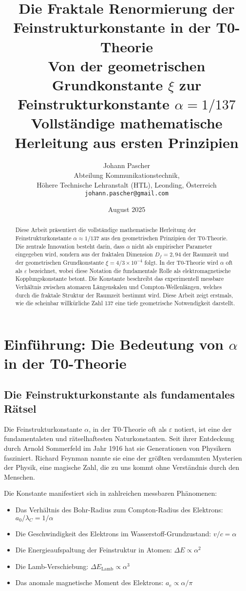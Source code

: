 \documentclass[12pt,a4paper]{article}
\title{\textbf{Die Fraktale Renormierung der Feinstrukturkonstante in der T0-Theorie}\\[0.5cm]
	\large Von der geometrischen Grundkonstante $\xi$ zur Feinstrukturkonstante $\alpha = 1/137$\\[0.3cm]
	\normalsize Vollständige mathematische Herleitung aus ersten Prinzipien}
\author{Johann Pascher\\
	\small Abteilung Kommunikationstechnik,\\
	\small Höhere Technische Lehranstalt (HTL), Leonding, Österreich\\
	\small \texttt{johann.pascher@gmail.com}}
\date{August 2025}
\theoremstyle{definition}
\begin{document}
	
	\maketitle
	
	\begin{abstract}
		Diese Arbeit präsentiert die vollständige mathematische Herleitung der Feinstrukturkonstante $\alpha \approx 1/137$ aus den geometrischen Prinzipien der T0-Theorie. Die zentrale Innovation besteht darin, dass $\alpha$ nicht als empirischer Parameter eingegeben wird, sondern aus der fraktalen Dimension $D_f = 2{,}94$ der Raumzeit und der geometrischen Grundkonstante $\xi = 4/3 \times 10^{-4}$ folgt. In der T0-Theorie wird $\alpha$ oft als $\varepsilon$ bezeichnet, wobei diese Notation die fundamentale Rolle als elektromagnetische Kopplungskonstante betont. Die Konstante beschreibt das experimentell messbare Verhältnis zwischen atomaren Längenskalen und Compton-Wellenlängen, welches durch die fraktale Struktur der Raumzeit bestimmt wird. Diese Arbeit zeigt erstmals, wie die scheinbar willkürliche Zahl 137 eine tiefe geometrische Notwendigkeit darstellt.
	\end{abstract}
	
	\tableofcontents
	\newpage
	
	\section{Einführung: Die Bedeutung von $\alpha$ in der T0-Theorie}
	
	\subsection{Die Feinstrukturkonstante als fundamentales Rätsel}
	
	Die Feinstrukturkonstante $\alpha$, in der T0-Theorie oft als $\varepsilon$ notiert, ist eine der fundamentalsten und rätselhaftesten Naturkonstanten. Seit ihrer Entdeckung durch Arnold Sommerfeld im Jahr 1916 hat sie Generationen von Physikern fasziniert. Richard Feynman nannte sie eine der größten verdammten Mysterien der Physik, eine magische Zahl, die zu uns kommt ohne Verständnis durch den Menschen.
	
	Die Konstante manifestiert sich in zahlreichen messbaren Phänomenen:
	\begin{itemize}
		\item Das Verhältnis des Bohr-Radius zum Compton-Radius des Elektrons: $a_0/\lambda_C = 1/\alpha$
		\item Die Geschwindigkeit des Elektrons im Wasserstoff-Grundzustand: $v/c = \alpha$
		\item Die Energieaufspaltung der Feinstruktur in Atomen: $\Delta E \propto \alpha^2$
		\item Die Lamb-Verschiebung: $\Delta E_{\text{Lamb}} \propto \alpha^3$
		\item Das anomale magnetische Moment des Elektrons: $a_e \propto \alpha/\pi$
	\end{itemize}
	
\end{document}

